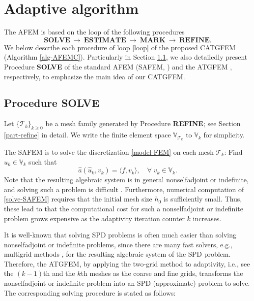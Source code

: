 \documentclass[preprint,times]{elsarticle}%
\numberwithin{algorithm}{section}
\numberwithin{equation}{section}
\newcommand{\ha}{\hat{a}}
\newcommand{\hu}{\hat{u}}
\newcommand{\mcT}{\mathcal{T}}
\newcommand{\mbV}{\mathbb{V}}
\def\geq{\geqslant}
\begin{document}
\section{Adaptive algorithm}\label{part-algorithm}
The AFEM is based on the loop of the following procedures
\begin{equation}\label{loop}
	\textbf{SOLVE}~\rightarrow~\textbf{ESTIMATE}~\rightarrow~\textbf{MARK}~\rightarrow~\textbf{REFINE}. 
\end{equation}	
We below describe each procedure of loop \eqref{loop} of the proposed CATGFEM (Algorithm \ref{alg-AFEMC}). Particularly in Section \ref{part-solve}, we also detailedly present Procedure \textbf{SOLVE} of the standard AFEM (SAFEM, \cite{NochettoSiebert09:409,FeischlFuhrer14:601}) and the ATGFEM \cite{LiYkZhangY21:A908}, respectively, to emphasize the main idea of our CATGFEM. 

\subsection{Procedure \textbf{SOLVE}}\label{part-solve}
Let $\{\mcT_k\}_{k \geq 0}$ be a mesh family generated by Procedure \textbf{REFINE}; see Section \ref{part-refine} in detail. We write the finite element space $\mbV_{\mcT_k}$ to $\mbV_k$ for simplicity. 

The SAFEM is to solve the discretization \eqref{model-FEM} on each mesh $\mcT_k$: Find $\hu_k \in \mbV_k$ such that 
	\begin{equation}\label{solve-SAFEM}
		\ha(\hu_k,v_k) = \langle f,v_k \rangle, \quad \forall \; v_k \in \mbV_k. 
	\end{equation}
Note that the resulting algebraic system is in general nonselfadjoint or indefinite, and solving such a problem is difficult \cite{XuJC92:303}. Furthermore, numerical computation of \eqref{solve-SAFEM} requires that the initial mesh size $h_0$ is sufficiently small. Thus, these lead to that the computational cost for such a nonselfadjoint or indefinite problem grows expensive as the adaptivity iteration counter $k$ increases. 

It is well-known that solving SPD problems is often much easier than solving nonselfadjoint or indefinite problems, since there are many fast solvers, e.g., multigrid methods \cite{McCormick87Book}, for the resulting algebraic system of the SPD problem. Therefore, the ATGFEM, by applying the two-grid method \cite{XuJC96:1759} to adaptivity, i.e., see the $(k-1)$th and the $k$th meshes as the coarse and fine grids, transforms the nonselfadjoint or indefinite problem into an SPD (approximate) problem to solve. The corresponding solving procedure is stated as follows: 
\end{document}
